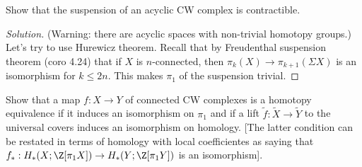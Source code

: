\begin{exercise}[4.2.8]
	Show that the suspension of an acyclic CW complex is contractible.
\end{exercise}
\begin{proof}[Solution]
	(Warning: there are acyclic spaces with non-trivial homotopy groups.) Let's try to use Hurewicz theorem. Recall that by Freudenthal suspension theorem (coro 4.24) that if $X$ is $n$-connected, then $\pi_{k}(X)\to\pi_{k+1}(\Sigma X)$ is an isomorphism for $k\leq 2n$. This makes $\pi_1$ of the suspension trivial.
\end{proof}


\begin{exercise}[4.2.12]
	Show that a map $f:X\to Y$ of connected CW complexes is a homotopy equivalence if it induces an isomorphism on $\pi_1$ and if a lift $\widetilde{f}:\widetilde{X}\to \widetilde{Y}$ to the universal covers induces an isomorphism on homology. [The latter condition can be restated in terms of homology with local coefficientes as saying that $f_*:H_*(X;\Z[\pi_1X])\to H_*(Y;\Z[\pi_1Y])$ is an isomorphism]. 
\end{exercise}



